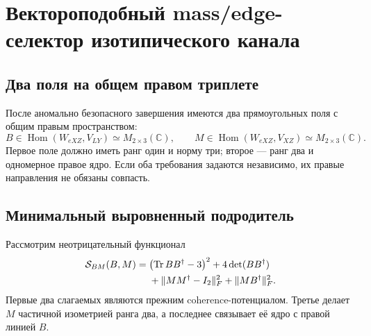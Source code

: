 \chapter{Вектороподобный mass/edge-селектор изотипического канала}
\label{ch:v8-baryon-c0-isotypic-channel-vectorlike-mass-edge-selector}

\section{Два поля на общем правом триплете}

После аномально безопасного завершения имеются два прямоугольных поля с
общим правым пространством:
\begin{equation}
 B\in\operatorname{Hom}(W_{eXZ},V_{LY})\simeq M_{2\times3}(\mathbb C),
 \qquad
 M\in\operatorname{Hom}(W_{eXZ},V_{XZ})\simeq M_{2\times3}(\mathbb C).
 \label{eq:v8-isotypic-mass-selector-two-fields}
\end{equation}
Первое поле должно иметь ранг один и норму три; второе --- ранг два и
одномерное правое ядро. Если оба требования задаются независимо, их правые
направления не обязаны совпасть.

\section{Минимальный выровненный подродитель}

Рассмотрим неотрицательный функционал
\begin{equation}
 \begin{split}
 \mathcal S_{BM}(B,M)={}&
 \bigl(\operatorname{Tr} BB^\dagger-3\bigr)^2
 +4\det(BB^\dagger)\\
 &+\|MM^\dagger-I_2\|_F^2
 +\|MB^\dagger\|_F^2.
 \end{split}
 \label{eq:v8-isotypic-mass-selector-action}
\end{equation}
Первые два слагаемых являются прежним coherence-потенциалом. Третье делает
$M$ частичной изометрией ранга два, а последнее связывает её ядро с
правой линией $B$.

